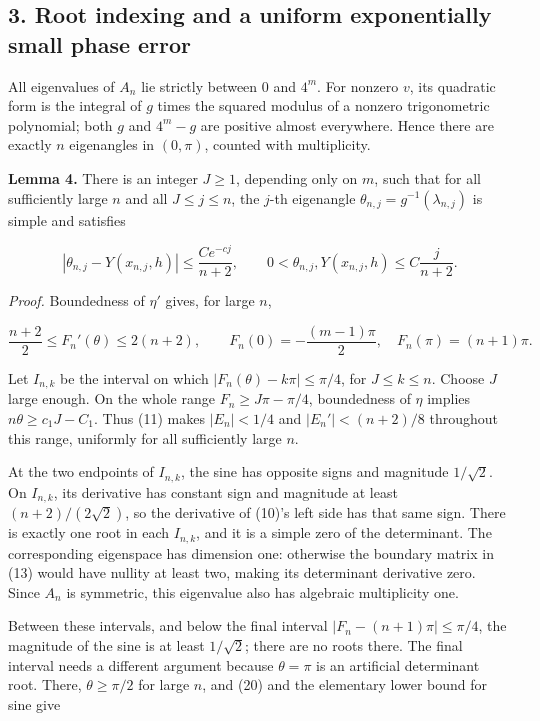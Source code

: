 \documentclass[10pt,a4paper]{article}
\begin{document}
\subsection{3. Root indexing and a uniform exponentially small phase error}\label{root-indexing-and-a-uniform-exponentially-small-phase-error}

All eigenvalues of \(A_n\) lie strictly between 0 and \(4^m\). For nonzero \(v\), its quadratic form is the integral of \(g\) times the squared modulus of a nonzero trigonometric polynomial; both \(g\) and \(4^m-g\) are positive almost everywhere. Hence there are exactly \(n\) eigenangles in \((0,\pi)\), counted with multiplicity.

\textbf{Lemma 4.} There is an integer \(J\ge1\), depending only on \(m\), such that for all sufficiently large \(n\) and all \(J\le j\le n\), the \(j\)-th eigenangle \(\theta_{n,j}=g^{-1}(\lambda_{n,j})\) is simple and satisfies

\nopagebreak[3]
\[
|\theta_{n,j}-Y(x_{n,j},h)|\le \frac{C e^{-cj}}{n+2},\qquad
0<\theta_{n,j},Y(x_{n,j},h)\le C\frac{j}{n+2}.
\tag{19}
\]

\emph{Proof.} Boundedness of \(\eta'\) gives, for large \(n\),

\nopagebreak[3]
\[
\frac{n+2}{2}\le F_n'(\theta)\le2(n+2),\qquad
F_n(0)=-\frac{(m-1)\pi}{2},\quad F_n(\pi)=(n+1)\pi.
\tag{20}
\]

Let \(I_{n,k}\) be the interval on which \(|F_n(\theta)-k\pi|\le\pi/4\), for \(J\le k\le n\). Choose \(J\) large enough. On the whole range \(F_n\ge J\pi-\pi/4\), boundedness of \(\eta\) implies \(n\theta\ge c_1J-C_1\). Thus (11) makes \(|E_n|<1/4\) and \(|E_n'|<(n+2)/8\) throughout this range, uniformly for all sufficiently large \(n\).

At the two endpoints of \(I_{n,k}\), the sine has opposite signs and magnitude \(1/\sqrt2\). On \(I_{n,k}\), its derivative has constant sign and magnitude at least \((n+2)/(2\sqrt2)\), so the derivative of (10)'s left side has that same sign. There is exactly one root in each \(I_{n,k}\), and it is a simple zero of the determinant. The corresponding eigenspace has dimension one: otherwise the boundary matrix in (13) would have nullity at least two, making its determinant derivative zero. Since \(A_n\) is symmetric, this eigenvalue also has algebraic multiplicity one.

Between these intervals, and below the final interval \(|F_n-(n+1)\pi|\le\pi/4\), the magnitude of the sine is at least \(1/\sqrt2\); there are no roots there. The final interval needs a different argument because \(\theta=\pi\) is an artificial determinant root. There, \(\theta\ge\pi/2\) for large \(n\), and (20) and the elementary lower bound for sine give
\end{document}
